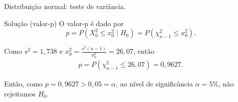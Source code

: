 \documentclass[8pt]{beamer}
\begin{document}
\begin{frame}{Distribuição normal: teste de variância.}

\Large

\begin{block}{Solução (valor-p)}
	O valor-p é dado por 
	$$p=P\left( X_0^2 \leq x_0^2 \mid H_0 \right) = P\left( \chi_{n-1}^2 \leq x_0^2  \right).$$
	
	Como $s^2=1,738$ e $x_0^2= \frac{s^2(n-1)}{\sigma_0^2} = 26,07$, então
	\begin{align*}
		p = P\left( \chi_{n-1}^2 \leq 26,07 \right) = 0,9627.
	\end{align*}
	
	Então, como $p=0,9627 > 0,05 = \alpha$, ao nível de significância $\alpha=5\%$, não rejeitamos $H_0$. 
\end{block}

\normalsize

\end{frame}
\end{document}
